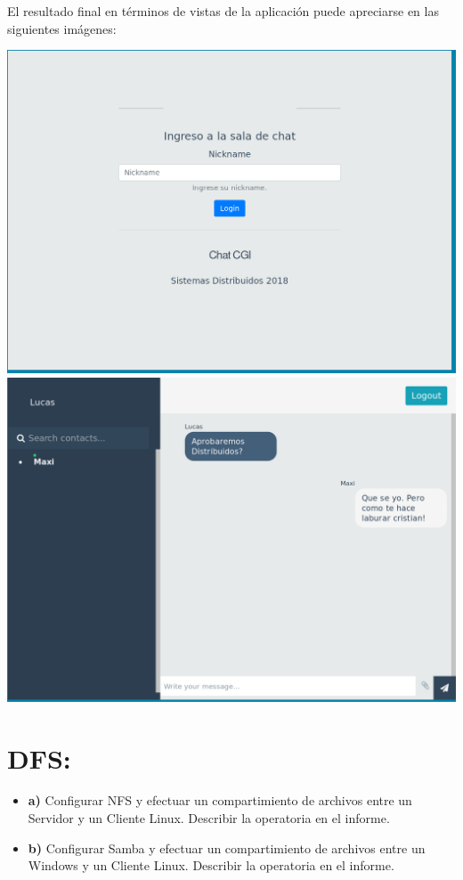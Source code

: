 \documentclass[12pt]{extarticle}
\begin{document}
    El resultado final en términos de vistas de la aplicación puede
apreciarse en las siguientes imágenes:

\includegraphics{images/login-chat.png}
\includegraphics{images/chat-chat.png}

    \section{DFS:}\label{dfs}

\begin{itemize}
\item
  \textbf{a)} Configurar NFS y efectuar un compartimiento de archivos
  entre un Servidor y un Cliente Linux. Describir la operatoria en el
  informe.
\item
  \textbf{b)} Configurar Samba y efectuar un compartimiento de archivos
  entre un Windows y un Cliente Linux. Describir la operatoria en el
  informe.
\end{itemize}
\end{document}
